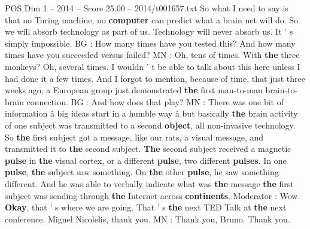 \begin{textsample}{POS Dim 1 – 2014 – Score 25.00 – 2014/t001657.txt}
So what I need to say is that no Turing machine, no \textbf{computer} can predict what a brain net will do.
So we will absorb technology as part of us.
Technology will never absorb us.
It ' s simply impossible.
BG : How many times have you tested this?
And how many times have you succeeded versus failed?
MN : Oh, tens of times.
With \textbf{the} three monkeys?
Oh, several times.
I wouldn ' t be able to talk about this here unless I had done it a few times.
And I forgot to mention, because of time, that just three weeks ago, a European group just demonstrated \textbf{the} first man-to-man brain-to-brain connection.
BG : And how does that play?
MN : There was one bit of information â big ideas start in a humble way â but basically \textbf{the} brain activity of one subject was transmitted to a second \textbf{object}, all non-invasive technology.
So \textbf{the} first subject got a message, like our rats, a visual message, and transmitted it to \textbf{the} second subject. \textbf{The} second subject received a magnetic \textbf{pulse} in \textbf{the} visual cortex, or a different \textbf{pulse}, two different \textbf{pulses}.
In one \textbf{pulse}, \textbf{the} subject saw something.
On \textbf{the} other \textbf{pulse}, he saw something different.
And he was able to verbally indicate what was \textbf{the} message \textbf{the} first subject was sending through \textbf{the} Internet across \textbf{continents}.
Moderator : Wow. \textbf{Okay}, that ' s where we are going.
That ' s \textbf{the} next TED Talk at \textbf{the} next conference.
Miguel Nicolelis, thank you.
MN : Thank you, Bruno.
Thank you.

\end{textsample}
